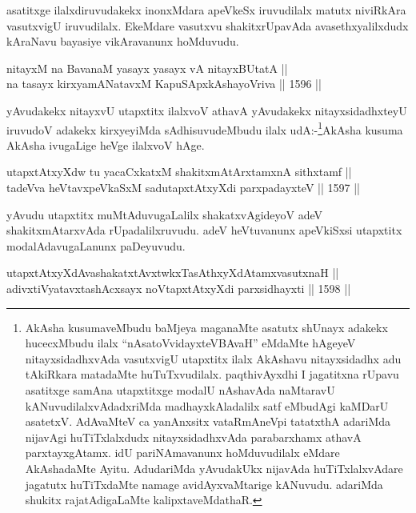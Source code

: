 \begin{artha}
asatitxge ilalxdiruvudakekx inonxMdara apeVkeSx iruvudilalx matutx niviRkAra vasutxvigU iruvudilalx. EkeMdare vasutxvu shakitxrUpavAda avasethxyalilxdudx kAraNavu bayasiye vikAravanunx hoMduvudu.
\end{artha}


\begin{shl}
nitayxM na BavanaM yasayx yasayx vA nitayxBUtatA || \\
na tasayx kirxyamANatavxM KapuSApxkAshayoVriva \hfill || 1596 ||  
\end{shl}

\begin{artha}
yAvudakekx nitayxvU utapxtitx ilalxvoV athavA yAvudakekx nitayxsidadhxteyU iruvudoV adakekx kirxyeyiMda sAdhisuvudeMbudu ilalx udA:-\footnote{AkAsha kusumaveMbudu baMjeya maganaMte asatutx shUnayx adakekx hucecxMbudu ilalx ``nAsatoVvidayxteVBAvaH'' eMdaMte hAgeyeV nitayxsidadhxvAda vasutxvigU utapxtitx ilalx AkAshavu nitayxsidadhx adu tAkiRkara matadaMte huTuTxvudilalx. paqthivAyxdhi I jagatitxna rUpavu asatitxge samAna utapxtitxge modalU nAshavAda naMtaravU kANuvudilalxvAdadxriMda madhayxkAladalilx satf eMbudAgi kaMDarU asatetxV. AdAvaMteV ca yanAnxsitx vataRmAneV\s pi tatatxthA adariMda nijavAgi huTiTxlalxdudx nitayxsidadhxvAda parabarxhamx athavA parxtayxgAtamx. idU pariNAmavanunx hoMduvudilalx eMdare AkAshadaMte Ayitu. AdudariMda yAvudakUkx nijavAda huTiTxlalxvAdare jagatutx huTiTxdaMte namage avidAyxvaMtarige kANuvudu. adariMda shukitx rajatAdigaLaMte kalipxtaveMdathaR.}AkAsha kusuma AkAsha ivugaLige heVge ilalxvoV hAge.
\end{artha}

\begin{shl}
utapxtAtxyXdw tu yacaCxkatxM shakitxmAtArxtamxnA sithxtamf || \\
tadeVva heVtavxpeVkaSxM sadutapxtAtxyXdi parxpadayxteV \hfill || 1597 ||  
\end{shl}

\begin{artha}
yAvudu utapxtitx muMtAduvugaLalilx shakatxvAgideyoV adeV shakitxmAtarxvAda rUpadalilxruvudu. adeV heVtuvanunx apeVkiSxsi utapxtitx modalAdavugaLanunx paDeyuvudu.
\end{artha}

\begin{shl}
utapxtAtxyXdAvashakatxtAvxtwkxTasAthxyXdAtamxvasutxnaH || \\
adivxtiVyatavxtashAcxsayx noVtapxtAtxyXdi parxsidhayxti \hfill || 1598 ||  
\end{shl}

